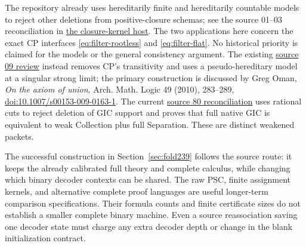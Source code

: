 The repository already uses hereditarily finite and hereditarily
countable models to reject other deletions from positive-closure
schemas; see the source 01--03 reconciliation in
\href{https://github.com/VladimirReshetnikov/ProveIt/blob/13ec39ed43148b1807f51ed6e6528e1c84659562/SetTheory/Cardinals/docs/reports/set-theory/zfc-closure-kernels/README.md}{the closure-kernel host}.
The two applications here concern the exact CP interfaces
\eqref{eq:filter-rootless} and \eqref{eq:filter-flat}.  No historical
priority is claimed for the models or the general consistency argument.
The existing
\href{https://github.com/VladimirReshetnikov/ProveIt/blob/13ec39ed43148b1807f51ed6e6528e1c84659562/SetTheory/Cardinals/docs/reports/set-theory/zfc-closure-kernels/intake-144-source-09-theory.md}{source 09 review}
instead removes CP's transitivity and uses a pseudo-hereditary model at
a singular strong limit; the primary construction is discussed by
Greg Oman, \emph{On the axiom of union}, Arch. Math. Logic 49 (2010),
283--289, \href{https://doi.org/10.1007/s00153-009-0163-1}{doi:10.1007/s00153-009-0163-1}.
The current
\href{https://github.com/VladimirReshetnikov/ProveIt/blob/13ec39ed43148b1807f51ed6e6528e1c84659562/SetTheory/Cardinals/docs/reports/set-theory/zfc-closure-kernels/intake-170.md}{source 80 reconciliation}
uses rational cuts to reject deletion of GIC support and proves that
full native GIC is equivalent to weak Collection plus full Separation.
These are distinct weakened packets.

The successful construction in Section~\ref{sec:fold239} follows the source
route: it keeps the already calibrated full theory and complete calculus,
while changing which binary decoder contexts can be shared.  The raw PSC, finite
assignment kernels, and alternative complete proof languages are useful
longer-term comparison specifications.  Their formula counts and finite
certificate sizes do not establish a smaller complete binary machine.
Even a source reassociation saving one decoder state must charge any
extra decoder depth or change in the blank initialization contract.
